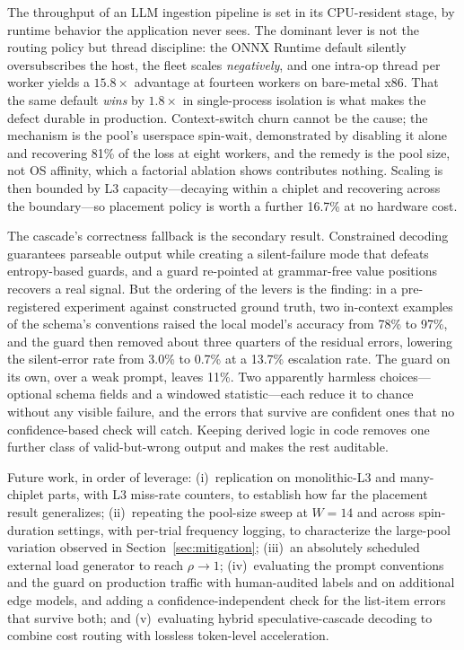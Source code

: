 \documentclass[conference]{IEEEtran}
\begin{document}
The throughput of an LLM ingestion pipeline is set in its CPU-resident stage, by runtime behavior the application never sees. The dominant lever is not the routing policy but thread discipline: the ONNX Runtime default silently oversubscribes the host, the fleet scales \emph{negatively}, and one intra-op thread per worker yields a $15.8\times$ advantage at fourteen workers on bare-metal x86. That the same default \emph{wins} by $1.8\times$ in single-process isolation is what makes the defect durable in production. Context-switch churn cannot be the cause; the mechanism is the pool's userspace spin-wait, demonstrated by disabling it alone and recovering 81\% of the loss at eight workers, and the remedy is the pool size, not OS affinity, which a factorial ablation shows contributes nothing. Scaling is then bounded by L3 capacity---decaying within a chiplet and recovering across the boundary---so placement policy is worth a further 16.7\% at no hardware cost.

The cascade's correctness fallback is the secondary result. Constrained decoding guarantees parseable output while creating a silent-failure mode that defeats entropy-based guards, and a guard re-pointed at grammar-free value positions recovers a real signal. But the ordering of the levers is the finding: in a pre-registered experiment against constructed ground truth, two in-context examples of the schema's conventions raised the local model's accuracy from 78\% to 97\%, and the guard then removed about three quarters of the residual errors, lowering the silent-error rate from 3.0\% to 0.7\% at a 13.7\% escalation rate. The guard on its own, over a weak prompt, leaves 11\%. Two apparently harmless choices---optional schema fields and a windowed statistic---each reduce it to chance without any visible failure, and the errors that survive are confident ones that no confidence-based check will catch. Keeping derived logic in code removes one further class of valid-but-wrong output and makes the rest auditable.

Future work, in order of leverage: (i)~replication on monolithic-L3 and many-chiplet parts, with L3 miss-rate counters, to establish how far the placement result generalizes; (ii)~repeating the pool-size sweep at $W{=}14$ and across spin-duration settings, with per-trial frequency logging, to characterize the large-pool variation observed in Section~\ref{sec:mitigation}; (iii)~an absolutely scheduled external load generator to reach $\rho\rightarrow1$; (iv)~evaluating the prompt conventions and the guard on production traffic with human-audited labels and on additional edge models, and adding a confidence-independent check for the list-item errors that survive both; and (v)~evaluating hybrid speculative-cascade decoding to combine cost routing with lossless token-level acceleration.
\end{document}
